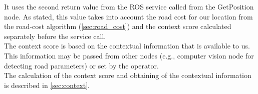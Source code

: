         It uses the second return value from the ROS service called from the GetPosition node. As stated, this value takes into account the road cost for our location from the road-cost algorithm (\ref{sec:road_cost}) and the context score calculated separately before the service call.\\
        The context score is based on the contextual information that is available to us. This information may be passed from other nodes (e.g., computer vision node for detecting road parameters) or set by the operator.\\
        The calculation of the context score and obtaining of the contextual information is described in \ref{sec:context}.